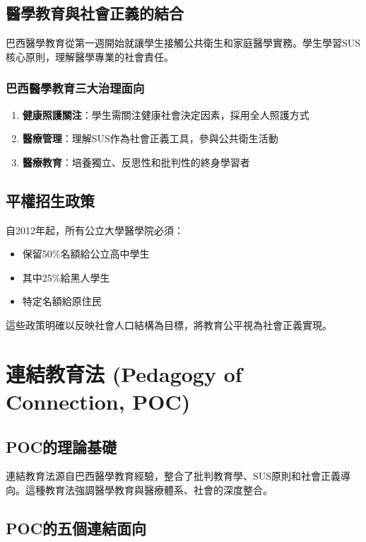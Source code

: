 \documentclass[12pt,a4paper]{article}
\begin{document}
\subsection{醫學教育與社會正義的結合}
巴西醫學教育從第一週開始就讓學生接觸公共衛生和家庭醫學實務。學生學習SUS核心原則，理解醫學專業的社會責任。

\subsubsection{巴西醫學教育三大治理面向}
\begin{enumerate}
    \item \textbf{健康照護關注}：學生需關注健康社會決定因素，採用全人照護方式
    \item \textbf{醫療管理}：理解SUS作為社會正義工具，參與公共衛生活動
    \item \textbf{醫療教育}：培養獨立、反思性和批判性的終身學習者
\end{enumerate}

\subsection{平權招生政策}
自2012年起，所有公立大學醫學院必須：
\begin{itemize}[nosep]
    \item 保留50\%名額給公立高中學生
    \item 其中25\%給黑人學生
    \item 特定名額給原住民
\end{itemize}

這些政策明確以反映社會人口結構為目標，將教育公平視為社會正義實現。

\section{連結教育法 (Pedagogy of Connection, POC)}

\subsection{POC的理論基礎}
連結教育法源自巴西醫學教育經驗，整合了批判教育學、SUS原則和社會正義導向。這種教育法強調醫學教育與醫療體系、社會的深度整合。

\subsection{POC的五個連結面向}
\end{document}
